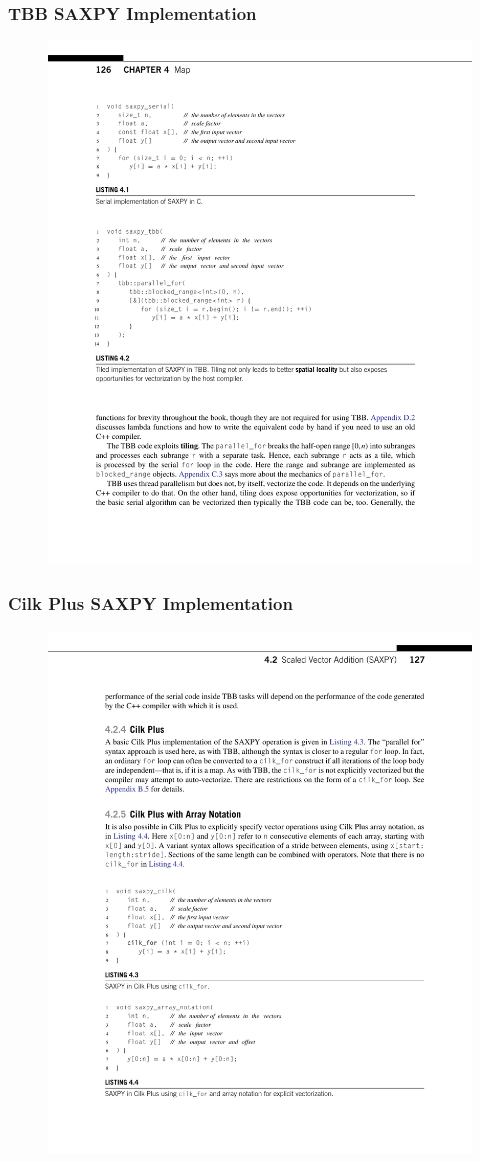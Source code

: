 \documentclass[xcolor=dvipsnames]{beamer}
\begin{document}
		\begin{frame} \frametitle{TBB SAXPY Implementation}
			\begin{figure}
				\centering
				\includegraphics[width=115mm]{images/listing-4-2.pdf}
			\end{figure}
		\end{frame}
		
		\begin{frame} \frametitle{Cilk Plus SAXPY Implementation}
			\begin{figure}
				\centering
				\includegraphics[width=115mm]{images/listing-4-3.pdf}
			\end{figure}
		\end{frame}
		
\end{document}
